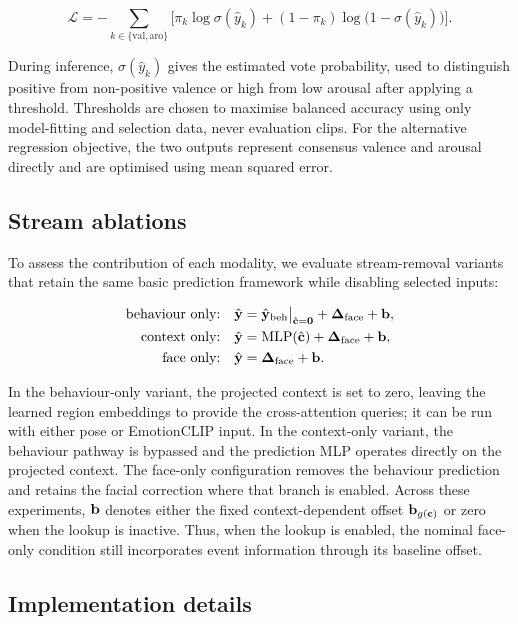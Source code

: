 \begin{equation}
  \mathcal{L} = -\sum_{k\in\{\text{val},\text{aro}\}}\Big[\pi_k\log\sigma(\hat{y}_k)+(1-\pi_k)\log\big(1-\sigma(\hat{y}_k)\big)\Big].
\end{equation}

During inference, $\sigma(\hat{y}_k)$ gives the estimated vote probability, used to distinguish positive from non-positive valence or high from low arousal after applying a threshold. Thresholds are chosen to maximise balanced accuracy using only model-fitting and selection data, never evaluation clips. For the alternative regression objective, the two outputs represent consensus valence and arousal directly and are optimised using mean squared error.

\subsection{Stream ablations}
\label{sec:ablations}

To assess the contribution of each modality, we evaluate stream-removal variants that retain the same basic prediction framework while disabling selected inputs:

\begin{align}
  \text{behaviour only:}\quad & \hat{\mathbf{y}} = \hat{\mathbf{y}}_{\text{beh}}\big|_{\hat{\mathbf{c}}=\mathbf{0}} + \bm{\Delta}_{\text{face}} + \mathbf{b}, \\
  \text{context only:}\quad & \hat{\mathbf{y}} = \mathrm{MLP}(\hat{\mathbf{c}}) + \bm{\Delta}_{\text{face}} + \mathbf{b}, \\
  \text{face only:}\quad & \hat{\mathbf{y}} = \bm{\Delta}_{\text{face}} + \mathbf{b}.
\end{align}

In the behaviour-only variant, the projected context is set to zero, leaving the learned region embeddings to provide the cross-attention queries; it can be run with either pose or EmotionCLIP input. In the context-only variant, the behaviour pathway is bypassed and the prediction MLP operates directly on the projected context. The face-only configuration removes the behaviour prediction and retains the facial correction where that branch is enabled. Across these experiments, $\mathbf{b}$ denotes either the fixed context-dependent offset $\mathbf{b}_{g(\mathbf{c})}$ or zero when the lookup is inactive. Thus, when the lookup is enabled, the nominal face-only condition still incorporates event information through its baseline offset.

\subsection{Implementation details}
\label{sec:impl}

